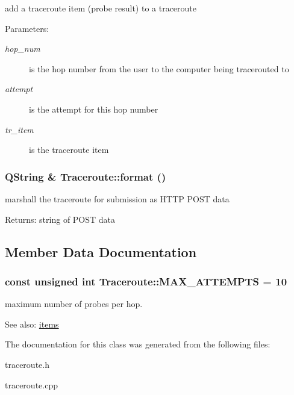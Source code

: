 add a traceroute item (probe result) to a traceroute \begin{Desc}
\item[Parameters:]
\begin{description}
\item[{\em hop\_\-num}]is the hop number from the user to the computer being tracerouted to \item[{\em attempt}]is the attempt for this hop number \item[{\em tr\_\-item}]is the traceroute item \end{description}
\end{Desc}
\hypertarget{classTraceroute_3360e93e25f81e6cc4aaa03a8a3507ba}{
\subsubsection[format]{\setlength{\rightskip}{0pt plus 5cm}QString \& Traceroute::format ()}}
\label{classTraceroute_3360e93e25f81e6cc4aaa03a8a3507ba}


marshall the traceroute for submission as HTTP POST data \begin{Desc}
\item[Returns:]string of POST data \end{Desc}


\subsection{Member Data Documentation}
\hypertarget{classTraceroute_4abb97c003bb8f524a8a1f2297762126}{
\subsubsection[MAX\_\-ATTEMPTS]{\setlength{\rightskip}{0pt plus 5cm}const unsigned int {\bf Traceroute::MAX\_\-ATTEMPTS} = 10}}
\label{classTraceroute_4abb97c003bb8f524a8a1f2297762126}


maximum number of probes per hop. 

\begin{Desc}
\item[See also:]\hyperlink{classTraceroute_2a3a2a7a2f73b2dd4fcb2e31aa7ac779}{items} \end{Desc}


The documentation for this class was generated from the following files:\begin{CompactItemize}
\item 
traceroute.h\item 
traceroute.cpp\end{CompactItemize}
